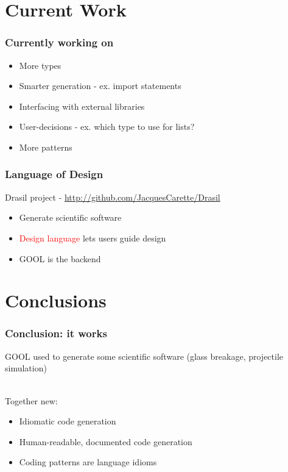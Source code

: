 \documentclass{beamer}
\begin{document}

\section[Current Work]{Current Work}



\begin{frame}

\frametitle{Currently working on}

\begin{itemize}
  \item More types
  \item Smarter generation - ex. import statements
  \item Interfacing with external libraries
  \item User-decisions - ex. which type to use for lists?
  \item More patterns
\end{itemize}

\end{frame}


\begin{frame}

\frametitle{Language of Design}

Drasil project - \url{http://github.com/JacquesCarette/Drasil}
\begin{itemize}
\item Generate scientific software
\item \textcolor{red}{Design language} lets users guide design
\item GOOL is the backend
\end{itemize}

\end{frame}


\section[Conclusions]{Conclusions}



\begin{frame}

\frametitle{Conclusion: it works}

GOOL used to generate some scientific software (glass 
breakage, projectile simulation)\\~\

Together new:
\begin{itemize}
  \item Idiomatic code generation
  \item Human-readable, documented code generation
  \item Coding patterns are language idioms\\~\
\end{itemize}

\end{frame}
\end{document}
